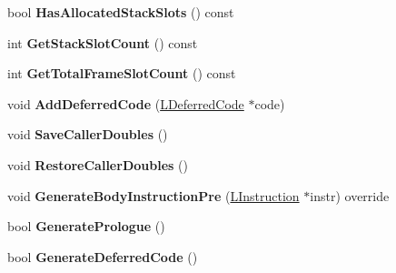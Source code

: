 \begin{DoxyCompactItemize}
\item 
bool {\bfseries Has\+Allocated\+Stack\+Slots} () const \hypertarget{classv8_1_1internal_1_1_l_code_gen_a6a5091a94d97298722ad3509d6fa41ab}{}\label{classv8_1_1internal_1_1_l_code_gen_a6a5091a94d97298722ad3509d6fa41ab}

\item 
int {\bfseries Get\+Stack\+Slot\+Count} () const \hypertarget{classv8_1_1internal_1_1_l_code_gen_ae997141e779eee569145e6d5f4326745}{}\label{classv8_1_1internal_1_1_l_code_gen_ae997141e779eee569145e6d5f4326745}

\item 
int {\bfseries Get\+Total\+Frame\+Slot\+Count} () const \hypertarget{classv8_1_1internal_1_1_l_code_gen_a7e0a34008896a2d4d09dab6f216df9cc}{}\label{classv8_1_1internal_1_1_l_code_gen_a7e0a34008896a2d4d09dab6f216df9cc}

\item 
void {\bfseries Add\+Deferred\+Code} (\hyperlink{classv8_1_1internal_1_1_l_deferred_code}{L\+Deferred\+Code} $\ast$code)\hypertarget{classv8_1_1internal_1_1_l_code_gen_a136807d3acd05ca71821c19ab49ef581}{}\label{classv8_1_1internal_1_1_l_code_gen_a136807d3acd05ca71821c19ab49ef581}

\item 
void {\bfseries Save\+Caller\+Doubles} ()\hypertarget{classv8_1_1internal_1_1_l_code_gen_a668f6d1f7c5aaf43fbfce22898808064}{}\label{classv8_1_1internal_1_1_l_code_gen_a668f6d1f7c5aaf43fbfce22898808064}

\item 
void {\bfseries Restore\+Caller\+Doubles} ()\hypertarget{classv8_1_1internal_1_1_l_code_gen_a094ae8da5b8b7b7d12990d25a4db2272}{}\label{classv8_1_1internal_1_1_l_code_gen_a094ae8da5b8b7b7d12990d25a4db2272}

\item 
void {\bfseries Generate\+Body\+Instruction\+Pre} (\hyperlink{classv8_1_1internal_1_1_l_instruction}{L\+Instruction} $\ast$instr) override\hypertarget{classv8_1_1internal_1_1_l_code_gen_a85d4251ce8010cd6b04358d6f54e1d13}{}\label{classv8_1_1internal_1_1_l_code_gen_a85d4251ce8010cd6b04358d6f54e1d13}

\item 
bool {\bfseries Generate\+Prologue} ()\hypertarget{classv8_1_1internal_1_1_l_code_gen_aff05496f75e5706dc01028ef21cd2065}{}\label{classv8_1_1internal_1_1_l_code_gen_aff05496f75e5706dc01028ef21cd2065}

\item 
bool {\bfseries Generate\+Deferred\+Code} ()\hypertarget{classv8_1_1internal_1_1_l_code_gen_a7edbe3129e1ff758f4c3d471d6038aee}{}\label{classv8_1_1internal_1_1_l_code_gen_a7edbe3129e1ff758f4c3d471d6038aee}


\end{DoxyCompactItemize}
